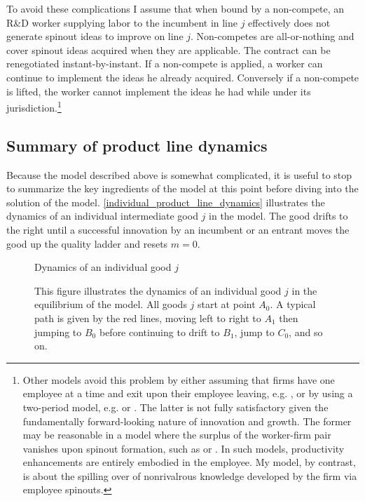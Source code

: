 \documentclass[12pt,english]{article}
\theoremstyle{remark}
\begin{document}
To avoid these complications I assume that when bound by a non-compete, an R\&D worker supplying labor to the incumbent in line $j$ effectively does not generate spinout ideas to improve on line $j$. Non-competes are all-or-nothing and cover spinout ideas acquired when they are applicable. The contract can be renegotiated instant-by-instant. If a non-compete is applied, a worker can continue to implement the ideas he already acquired. Conversely if a non-compete is lifted, the worker cannot implement the ideas he had while under its jurisdiction.\footnote{Other models avoid this problem by either assuming that firms have one employee at a time and exit upon their employee leaving, e.g. \cite{shi_restrictions_2018}, or by using a two-period model, e.g. \cite{franco_spin-outs:_2006} or \cite{franco_covenants_2008}. The latter is not fully satisfactory given the fundamentally forward-looking nature of innovation and growth. The former may be reasonable in a model where the surplus of the worker-firm pair vanishes upon spinout formation, such as \cite{shi_restrictions_2018} or \cite{baslandze_spinout_2019}. In such models, productivity enhancements are entirely embodied in the employee. My model, by contrast, is about the spilling over of nonrivalrous knowledge developed by the firm via employee spinouts.}



\subsection{Summary of product line dynamics}

Because the model described above is somewhat complicated, it is useful to stop to summarize the key ingredients of the model at this point before diving into the solution of the model. \autoref{individual_product_line_dynamics} illustrates the dynamics of an individual intermediate good $j$ in the model. The good drifts to the right until a successful innovation by an incumbent or an entrant moves the good up the quality ladder and resets $m = 0$.

\begin{figure}[h]{Dynamics of an individual good $j$}
	\centering
	
	\caption{This figure illustrates the dynamics of an individual good $j$ in the equilibrium of the model. All goods $j$ start at point $A_0$. A typical path is given by the red lines, moving left to right to $A_1$ then jumping to $B_0$ before continuing to drift to $B_1$, jump to $C_0$, and so on.}
	\label{individual_product_line_dynamics}
\end{figure}
\end{document}
